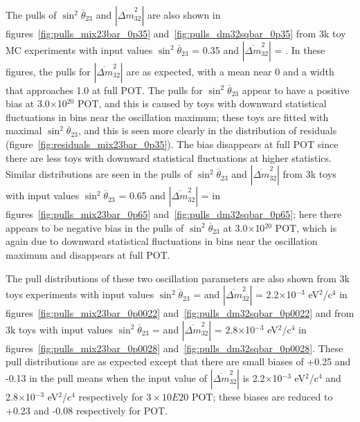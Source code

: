 The pulls of $\sin^{2}\overline{\theta}_{23}$ and $|\overline{\Delta m}^2_{32}|$ are also shown in
figures~\ref{fig:pulls_mix23bar_0p35} and~\ref{fig:pulls_dm32sqbar_0p35} from 3k toy MC experiments with input values 
$\sin^{2}\overline{\theta}_{23}$ = 0.35 and $|\overline{\Delta m}^2_{32}|$ = \DmsqNH{}. In these figures, the pulls 
for $|\overline{\Delta m}^2_{32}|$ are as expected, with a mean near 0 and a width that approaches 1.0 at full POT.
The pulls for $\sin^{2}\overline{\theta}_{23}$ appear to have a positive bias at 3.0$\times$10$^{20}$ POT, and 
this is caused by toys with downward statistical fluctuations in bins near the oscillation maximum; these toys 
are fitted with maximal $\sin^{2}\overline{\theta}_{23}$, and this is seen more clearly in the distribution of 
residuals (figure~\ref{fig:residuals_mix23bar_0p35}). The bias disappears at full POT since there are less toys 
with downward statistical fluctuations at higher statistics. Similar distributions are seen in the pulls of 
$\sin^{2}\overline{\theta}_{23}$ and $|\overline{\Delta m}^2_{32}|$ from 3k toys with input values 
$\sin^{2}\overline{\theta}_{23}$ = 0.65 and $|\overline{\Delta m}^2_{32}|$ = \DmsqNH{} in
figures~\ref{fig:pulls_mix23bar_0p65} and~\ref{fig:pulls_dm32sqbar_0p65}; here there appears to be negative bias 
in the pulls of $\sin^{2}\overline{\theta}_{23}$ at 3.0$\times$10$^{20}$ POT, which is again due to downward 
statistical fluctuations in bins near the oscillation maximum and disappears at full POT. 

The pull distributions of these two oscillation parameters are also shown from 3k toys experiments with input values 
$\sin^{2}\overline{\theta}_{23}$ = \NonReactorMixingTwoThreeNH{} and $|\overline{\Delta m}^2_{32}|$ = 2.2$\times$10$^{-3}$ 
eV$^{2}$/c$^{4}$ in figures~\ref{fig:pulls_mix23bar_0p0022} and~\ref{fig:pulls_dm32sqbar_0p0022} and from 3k toys 
with input values $\sin^{2}\overline{\theta}_{23}$ = \NonReactorMixingTwoThreeNH{} and $|\overline{\Delta m}^2_{32}|$ = 
2.8$\times$10$^{-3}$ eV$^{2}$/c$^{4}$ in figures~\ref{fig:pulls_mix23bar_0p0028} and~\ref{fig:pulls_dm32sqbar_0p0028}. 
These pull distributions are as expected except that there are small biases of +0.25 and -0.13 in the pull means when the 
input value of $|\overline{\Delta m}^2_{32}|$ is 2.2$\times$10$^{-3}$ eV$^{2}$/c$^{4}$ and 2.8$\times$10$^{-3}$ eV$^{2}$/c$^{4}$ 
respectively for $3 \times 10E{20}$ POT; these biases are reduced to +0.23 and -0.08 respectively for \TargetFullPot{} POT.   
 
%
% 

